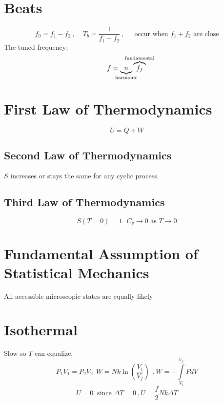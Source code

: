 \documentclass[10pt,a4paper]{article}
\begin{document}
\section{Beats} %
\label{sec:beats}
\begin{equation}
    f_0 = f_1 - f_2 ~, ~~~~~ T_b = \frac{1}{f_1-f_2}~,~~~~~\textrm{ occur when }f_1 + f_2 \textrm{ are close}
\end{equation}
The tuned frequency:
\begin{equation}
    f = \underbrace{n}_{\mathclap{\textrm{harmonic}}}\overbrace{f_f}^{\mathclap{\textrm{fundamental}}}
\end{equation}

\section{First Law of Thermodynamics} %
\label{sec:first_law_of_thermo}
\begin{equation}
    U = Q + W
\end{equation}
\subsection{Second Law of Thermodynamics} %
\label{sub:second_law_of_thermo}
$S$ increases or stays the same for any cyclic process. 
\subsection{Third Law of Thermodynamics} %
\label{sub:third_law_of_thermo}
\begin{equation}
    S(T=0)=1~~~ C_v \rightarrow 0 \textrm{ as } T \rightarrow 0
\end{equation}

\section{Fundamental Assumption of Statistical Mechanics} %
\label{sec:fundamental_assumption_of_statistical_mechanics}
All accessible microscopic states are equally likely

\section{Isothermal} %
\label{sec:isothermal}
Slow so $T$ can equalize.
\begin{equation}
    P_1V_1 = P_2V_2~~W = Nk\ln \left( \frac{V_i}{V_f} \right) ~~, W = -\int \limits_{V_i}^{V_f}PdV
\end{equation}
\begin{equation}
    U=0~ \textrm{ since }\Delta T=0~, U = \frac{f}{2}Nk \Delta T
\end{equation}
\end{document}
